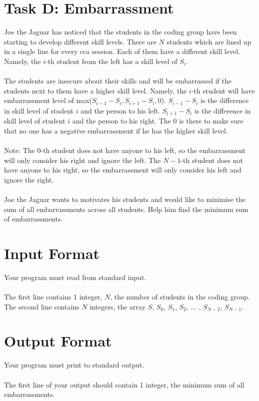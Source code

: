\documentclass{report}
\begin{document}
\pagebreak
\hfill \break \hfill \break

\section*{Task D: Embarrassment}
Joe the Jaguar has noticed that the students in the coding group have been starting to develop different skill levels. There are $N$ students which are lined up in a single line for every cca session. Each of them have a different skill level. Namely, the $i$-th student from the left has a skill level of $S_i$.
\\\\
The students are insecure about their skills and will be embarrassed if the students next to them have a higher skill level. Namely, the $i$-th student will have embarrassment level of max($S_{i-1}-S_i, S_{i+1}-S_i, 0$). $S_{i-1}-S_i$ is the difference in skill level of student $i$ and the person to his left. $S_{i+1}-S_i$ is the difference in skill level of student $i$ and the person to his right. The 0 is there to make sure that no one has a negative embarrassment if he has the higher skill level. 
\\\\
Note: The $0$-th student does not have anyone to his left, so the embarrassment will only consider his right and ignore the left. The $N-1$-th student does not have anyone to his right, so the embarrassment will only consider his left and ignore the right.
\\\\
Joe the Jaguar wants to motivates his students and would like to minimise the sum of all embarrassments across all students. Help him find the minimum sum of embarrassments.

\section*{Input Format}
Your program must read from standard input.
\\\\
The first line contains 1 integer, $N$, the number of students in the coding group.
\\
The second line contains $N$ integers, the array $S$, $S_0$, $S_1$, $S_2$, ... , $S_{N-2}$, $S_{N-1}$.

\section*{Output Format}
Your program must print to standard output.
\\\\
The first line of your output should contain 1 integer, the minimum sum of all embarrassments.
\end{document}
